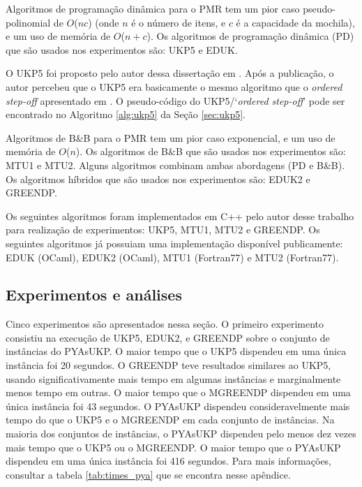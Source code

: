 Algoritmos de programação dinâmica para o PMR tem um pior caso pseudo-polinomial de \(O\)(\(nc\)) (onde \(n\) é o número de itens, e \(c\) é a capacidade da mochila), e um uso de memória de \(O\)(\(n + c\)).
Os algoritmos de programação dinâmica (PD) que são usados nos experimentos são: UKP5 e EDUK.

O UKP5 foi proposto pelo autor dessa dissertação em \cite{sea2016}.
Após a publicação, o autor percebeu que o UKP5 era basicamente o mesmo algoritmo que o \emph{ordered step-off} apresentado em \cite{gg-66}.
O pseudo-código do UKP5/`\emph{ordered step-off}' pode ser encontrado no Algoritmo \ref{alg:ukp5} da Seção \ref{sec:ukp5}.

Algoritmos de B\&B para o PMR tem um pior caso exponencial, e um uso de memória de \(O\)(\(n\)).
Os algoritmos de B\&B que são usados nos experimentos são: MTU1 e MTU2.
Alguns algoritmos combinam ambas abordagens (PD e B\&B). 
Os algoritmos híbridos que são usados nos experimentos são: EDUK2 e GREENDP.

Os seguintes algoritmos foram implementados em C++ pelo autor desse trabalho para realização de experimentos: UKP5, MTU1, MTU2 e GREENDP.
Os seguintes algoritmos já possuiam uma implementação disponível publicamente: EDUK (OCaml), EDUK2 (OCaml), MTU1 (Fortran77) e MTU2 (Fortran77).

\subsection{Experimentos e análises}

Cinco experimentos são apresentados nessa seção.
O primeiro experimento consistiu na execução de UKP5, EDUK2, e GREENDP sobre o conjunto de instâncias do PYAsUKP.
O maior tempo que o UKP5 dispendeu em uma única instância foi 20 segundos.
O GREENDP teve resultados similares ao UKP5, usando significativamente mais tempo em algumas instâncias e marginalmente menos tempo em outras.
O maior tempo que o MGREENDP dispendeu em uma única instância foi 43 segundos.
O PYAsUKP dispendeu consideravelmente mais tempo do que o UKP5 e o MGREENDP em cada conjunto de instâncias.
Na maioria dos conjuntos de instâncias, o PYAsUKP dispendeu pelo menos dez vezes mais tempo que o UKP5 ou o MGREENDP.
O maior tempo que o PYAsUKP dispendeu em uma única instância foi 416 segundos.
Para mais informações, consultar a tabela \ref{tab:times_pya} que se encontra nesse apêndice.

